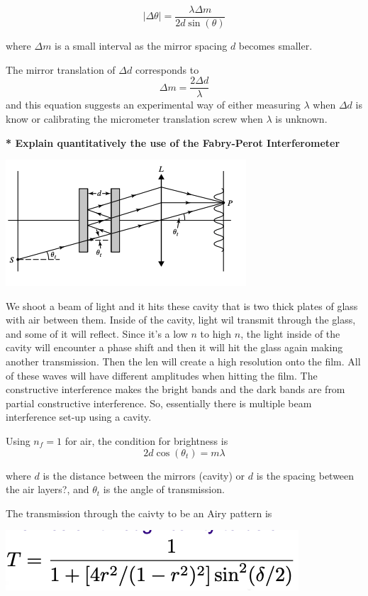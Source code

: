 \documentclass[10pt]{article}
\newcounter{counter}
\newcommand*{\lo}[1]{
    \textbf{* #1} \newline
}
\begin{document}
\[|\Delta \theta| = \frac{\lambda \Delta m}{2d\sin(\theta)}\]

where $\Delta m$ is a small interval as the mirror spacing $d$ becomes smaller.

\newblock

The mirror translation of $\Delta d$ corresponds to 
\[\Delta m = \frac{2 \Delta d}{\lambda}\]
and this equation suggests an experimental way of either measuring $\lambda$ when $\Delta d$ is know or calibrating the micrometer translation screw when $\lambda$ is unknown.

\newpage

\lo{Explain quantitatively the use of
the Fabry-Perot Interferometer}

\begin{center}
    \includegraphics*[scale = 1]{imgs/fb-setup.png}
\end{center}

We shoot a beam of light and it hits these cavity that is two thick plates of glass with air between them. Inside of the cavity, light wil transmit through the glass, and some of it will reflect. Since it's a low $n$ to high $n$, the light inside of the cavity will encounter a phase shift and then it will hit the glass again making another transmission. Then the len will create a high resolution onto the film. All of these waves will have different amplitudes when hitting the film. The constructive interference makes the bright bands and the dark bands are from partial constructive interference. So, essentially there is multiple beam interference set-up using a cavity.

Using $n_f = 1$ for air, the condition for brightness is 
\[2d\cos(\theta_t) = m \lambda\]

where $d$ is the distance between the mirrors (cavity) or $d$ is the spacing between the air layers?, and $\theta_t$ is the angle of transmission.

The transmission through the caivty to be an Airy pattern is

\begin{center}
    \includegraphics*[scale = .5]{imgs/airy-function.png}
\end{center}
\end{document}
